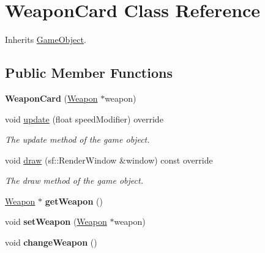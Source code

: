 \hypertarget{class_weapon_card}{\section{Weapon\+Card Class Reference}
\label{class_weapon_card}
}


Inherits \hyperlink{class_game_object}{Game\+Object}.

\subsection*{Public Member Functions}
\begin{DoxyCompactItemize}
\item 
\hypertarget{class_weapon_card_aeba9686102eabee16beba92eb6ccf9d8}{{\bfseries Weapon\+Card} (\hyperlink{class_weapon}{Weapon} $\ast$weapon)}\label{class_weapon_card_aeba9686102eabee16beba92eb6ccf9d8}

\item 
void \hyperlink{class_weapon_card_a160dc14db9e74b67537e74fcbf0a6e75}{update} (float speed\+Modifier) override
\begin{DoxyCompactList}\small\item\em The update method of the game object. \end{DoxyCompactList}\item 
void \hyperlink{class_weapon_card_a96b2a3317bbc9228dc22947ef3086883}{draw} (sf\+::\+Render\+Window \&window) const override
\begin{DoxyCompactList}\small\item\em The draw method of the game object. \end{DoxyCompactList}\item 
\hypertarget{class_weapon_card_afe7e0c4ab0aa2fa0b3f2ef86a16cecc0}{\hyperlink{class_weapon}{Weapon} $\ast$ {\bfseries get\+Weapon} ()}\label{class_weapon_card_afe7e0c4ab0aa2fa0b3f2ef86a16cecc0}

\item 
\hypertarget{class_weapon_card_a764285ce92ffbe9712ddd83a5b8a8402}{void {\bfseries set\+Weapon} (\hyperlink{class_weapon}{Weapon} $\ast$weapon)}\label{class_weapon_card_a764285ce92ffbe9712ddd83a5b8a8402}

\item 
\hypertarget{class_weapon_card_a063b1986fe8bd4e62b55b6186b426b7d}{void {\bfseries change\+Weapon} ()}\label{class_weapon_card_a063b1986fe8bd4e62b55b6186b426b7d}

\end{DoxyCompactItemize}
